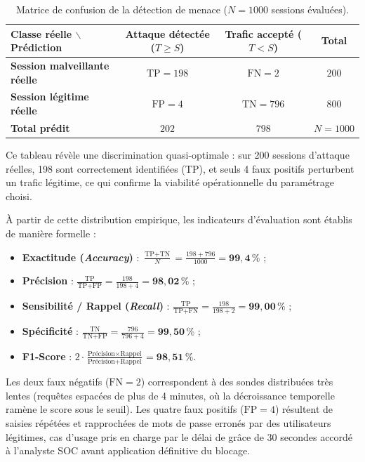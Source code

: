\begin{table}[!htbp]
\centering
\small
\begin{tabular}{@{}lccc@{}}
\toprule
\textbf{Classe réelle $\backslash$ Prédiction} & \textbf{Attaque détectée ($T \ge S$)} & \textbf{Trafic accepté ($T < S$)} & \textbf{Total} \\
\midrule
\textbf{Session malveillante réelle} & $\text{TP} = 198$ & $\text{FN} = 2$ & $200$ \\
\textbf{Session légitime réelle} & $\text{FP} = 4$ & $\text{TN} = 796$ & $800$ \\
\midrule
\textbf{Total prédit} & $202$ & $798$ & $N = 1000$ \\
\bottomrule
\end{tabular}
\caption{Matrice de confusion de la détection de menace ($N = 1000$ sessions évaluées).}
\label{tab:confusion_matrix}
\end{table}

Ce tableau révèle une discrimination quasi-optimale : sur 200 sessions d'attaque réelles, 198 sont correctement identifiées (TP), et seuls 4 faux positifs perturbent un trafic légitime, ce qui confirme la viabilité opérationnelle du paramétrage choisi.

À partir de cette distribution empirique, les indicateurs d'évaluation sont établis de manière formelle :
\begin{itemize}[leftmargin=*]
    \item \textbf{Exactitude (\textit{Accuracy})} : $\frac{\text{TP} + \text{TN}}{N} = \frac{198 + 796}{1000} = \mathbf{99{,}4\,\%}$ ;
    \item \textbf{Précision} : $\frac{\text{TP}}{\text{TP} + \text{FP}} = \frac{198}{198 + 4} = \mathbf{98{,}02\,\%}$ ;
    \item \textbf{Sensibilité / Rappel (\textit{Recall})} : $\frac{\text{TP}}{\text{TP} + \text{FN}} = \frac{198}{198 + 2} = \mathbf{99{,}00\,\%}$ ;
    \item \textbf{Spécificité} : $\frac{\text{TN}}{\text{TN} + \text{FP}} = \frac{796}{796 + 4} = \mathbf{99{,}50\,\%}$ ;
    \item \textbf{F1-Score} : $2 \cdot \frac{\text{Précision} \times \text{Rappel}}{\text{Précision} + \text{Rappel}} = \mathbf{98{,}51\,\%}$.
\end{itemize}

Les deux faux négatifs ($\text{FN} = 2$) correspondent à des sondes distribuées très lentes (requêtes espacées de plus de 4 minutes, où la décroissance temporelle ramène le score sous le seuil). Les quatre faux positifs ($\text{FP} = 4$) résultent de saisies répétées et rapprochées de mots de passe erronés par des utilisateurs légitimes, cas d'usage pris en charge par le délai de grâce de 30 secondes accordé à l'analyste SOC avant application définitive du blocage.

